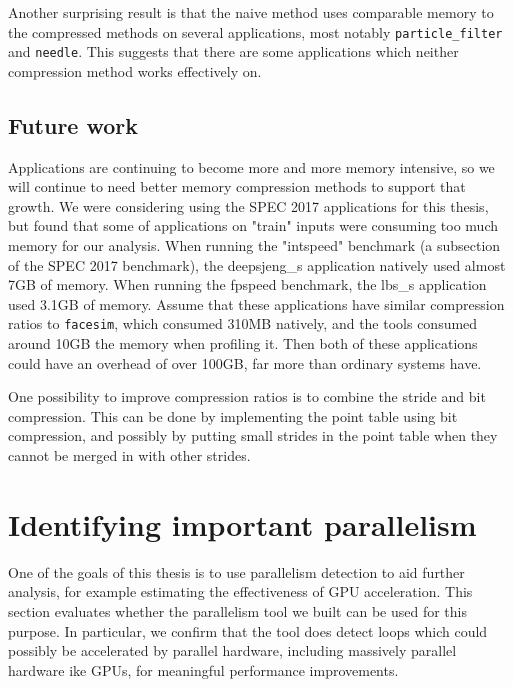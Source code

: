 \documentclass[12pt,twoside]{reedthesis}
\begin{document}
		Another surprising result is that the naive method uses comparable memory to the compressed methods on several applications, most notably \texttt{particle\_filter} and \texttt{needle}. This suggests that there are some applications which neither compression method works effectively on. 
		
		
		
		\subsection{Future work}
		
		Applications are continuing to become more and more memory intensive, so we will continue to need better memory compression methods to support that growth. We were considering using the SPEC 2017 applications for this thesis, but found that some of applications on "train" inputs were consuming too much memory for our analysis. When running the "intspeed" benchmark (a subsection of the SPEC 2017 benchmark), the deepsjeng\_s application natively used almost 7GB of memory. When running the fpspeed benchmark, the lbs\_s application used 3.1GB of memory.  
		Assume that these applications have similar compression ratios to \texttt{facesim}, which consumed 310MB natively, and the tools consumed around 10GB the memory when profiling it. Then both of these applications could have an overhead of over 100GB, far more than ordinary systems have. 

		
		One possibility to improve compression ratios is to combine the stride and bit compression. This can be done by implementing the point table using bit compression, and possibly by putting small strides in the point table when they cannot be merged in with other strides. 
		
	
	\section{Identifying important parallelism}\label{s:important-paralleism}
		
		One of the goals of this thesis is to use parallelism detection to aid further analysis, for example estimating the effectiveness of GPU acceleration. 
		This section evaluates whether the parallelism tool we built can be used for this purpose. In particular, we confirm that the tool does detect loops which could possibly be accelerated by parallel hardware, including massively parallel hardware ike GPUs, for meaningful performance improvements. 
		
\end{document}
